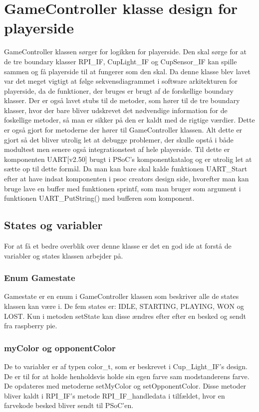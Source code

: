 \documentclass[Softwaredesign/Softwaredesign_main.tex]{subfiles}
\begin{document}
\section{GameController klasse design for playerside}
GameController klassen sørger for logikken for playerside. Den skal sørge for at de tre boundary klasser RPI\_IF, CupLight\_IF og CupSensor\_IF kan spille sammen og få playerside til at fungerer som den skal. Da denne klasse blev lavet var det meget vigtigt at følge sekvensdiagrammet i software arkitekturen for playerside, da de funktioner, der bruges er brugt af de forskellige boundary klasser. Der er også lavet stubs til de metoder, som hører til de tre boundary klasser, hvor der bare bliver udskrevet det nødvendige information for de foskellige metoder, så man er sikker på den er kaldt med de rigtige værdier. Dette er også gjort for metoderne der hører til GameController klassen. Alt dette er gjort så det bliver utrolig let at debugge problemer, der skulle opstå i både modultest men senere også integrationstest af hele playerside. Til dette er komponenten UART[v2.50] brugt i PSoC's komponentkatalog og er utrolig let at sætte op til dette formål. Da man kan bare skal kalde funktionen UART\_Start efter at have indsat komponenten i psoc creators design side, hvorefter man kan bruge lave en buffer med funktionen sprintf, som man bruger som argument i funktionen UART\_PutString() med bufferen som komponent. 
\subsection{States og variabler}
For at få et bedre overblik over denne klasse er det en god ide at forstå de variabler og states klassen arbejder på.
\subsubsection{Enum Gamestate}
Gamestate er en enum i GameController klassen som beskriver alle de states klassen kan være i. De fem states er: IDLE, STARTING, PLAYING, WON og LOST. Kun i metoden setState kan disse ændres efter efter en besked og sendt fra raspberry pie.
\subsubsection{myColor og opponentColor}
De to variabler er af typen color\_t, som er beskrevet i Cup\_Light\_IF's design. De er til for at holde henholdsvis holde sin egen farve sam modstanderens farve. De opdateres med metoderne setMyColor og setOpponentColor. Disse metoder bliver kaldt i RPI\_IF's metode RPI\_IF\_handledata i tilfældet, hvor en farvekode besked bliver sendt til PSoC'en. 
\end{document}
